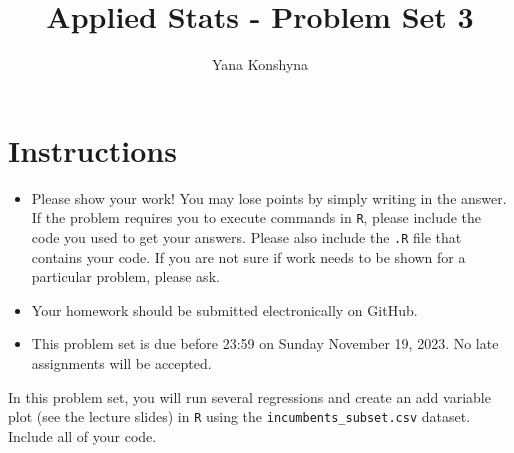 \documentclass[12pt,letterpaper]{article}
\title{Applied Stats - Problem Set 3}
\author{Yana Konshyna}
\begin{document}
	\maketitle
	\section*{Instructions}
	\begin{itemize}
		\item Please show your work! You may lose points by simply writing in the answer. If the problem requires you to execute commands in \texttt{R}, please include the code you used to get your answers. Please also include the \texttt{.R} file that contains your code. If you are not sure if work needs to be shown for a particular problem, please ask.
	\item Your homework should be submitted electronically on GitHub.
	\item This problem set is due before 23:59 on Sunday November 19, 2023. No late assignments will be accepted.

	\end{itemize}

		\vspace{.25cm}
	
\noindent In this problem set, you will run several regressions and create an add variable plot (see the lecture slides) in \texttt{R} using the \texttt{incumbents\_subset.csv} dataset. Include all of your code.

\vspace{.5cm}
\end{document}
